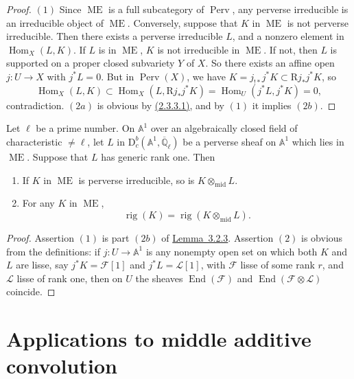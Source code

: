 \begin{proof}
\((1)\) Since \(\operatorname{ME}\) is a full subcategory of
\(\operatorname{Perv}\), any perverse irreducible is an irreducible object of
\(\operatorname{ME}\). Conversely, suppose that \(K\) in \(\operatorname{ME}\)
is not perverse irreducible. Then there exists a perverse irreducible \(L\),
and a nonzero element in \(\operatorname{Hom}_X(L,K)\). If \(L\) is in
\(\operatorname{ME}\), \(K\) is not irreducible in \(\operatorname{ME}\). If
not, then \(L\) is supported on a proper closed subvariety \(Y\) of \(X\). So
there exists an affine open \(j:U\to X\) with \(j^*L=0\). But in
\(\operatorname{Perv}(X)\), we have \(K=j_{!*}j^*K\subset \mathrm{R}j_*j^*K\),
so
\[
  \operatorname{Hom}_X(L,K)
  \subset
  \operatorname{Hom}_X(L,\mathrm{R}j_*j^*K)
  =
  \operatorname{Hom}_U(j^*L,j^*K)
  =
  0,
\]
contradiction. \((2a)\) is obvious by \hyperref[par:2.3.3.1]{(2.3.3.1)}, and
by \((1)\) it implies \((2b)\).
\end{proof}

Let \(\ell\) be a prime number. On \(\mathbb{A}^1\) over an algebraically
closed field of characteristic \(\ne\ell\), let \(L\) in
\(\mathrm{D}^b_c(\mathbb{A}^1,\overline{\mathbb{Q}}_\ell)\) be a perverse
sheaf on \(\mathbb{A}^1\) which lies in \(\operatorname{ME}\). Suppose that
\(L\) has generic rank one. Then
\begin{enumerate}[label=(\arabic*)]
\item If \(K\) in \(\operatorname{ME}\) is perverse irreducible, so is
\(K\otimes_{\mathrm{mid}}L\).
\item For any \(K\) in \(\operatorname{ME}\),
\[
  \operatorname{rig}(K)=\operatorname{rig}(K\otimes_{\mathrm{mid}}L).
\]
\end{enumerate}

\begin{proof}
Assertion \((1)\) is part \((2b)\) of
\hyperref[lem:3.2.3]{Lemma~3.2.3}. Assertion \((2)\) is obvious from the
definitions: if \(j:U\to\mathbb{A}^1\) is any nonempty open set on which both
\(K\) and \(L\) are lisse, say
\(j^*K=\mathcal{F}[1]\) and \(j^*L=\mathcal{L}[1]\), with \(\mathcal{F}\)
lisse of some rank \(r\), and \(\mathcal{L}\) lisse of rank one, then on \(U\)
the sheaves \(\operatorname{End}(\mathcal{F})\) and
\(\operatorname{End}(\mathcal{F}\otimes\mathcal{L})\) coincide.
\end{proof}

\section{Applications to middle additive convolution}\label{sec:3.3}

